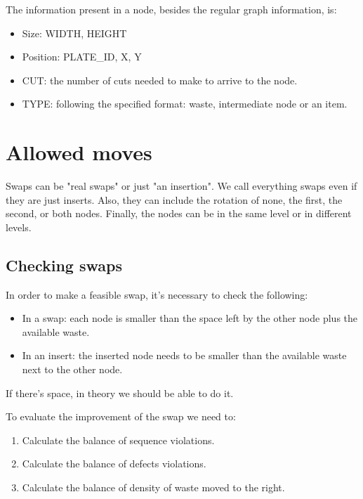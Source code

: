 \documentclass{roadef}
\begin{document}
        The information present in a node, besides the regular graph information, is:

        \begin{itemize}

            \item Size: WIDTH, HEIGHT
            \item Position: PLATE\_ID, X, Y
            \item CUT: the number of cuts needed to make to arrive to the node.
            \item TYPE: following the specified format: waste, intermediate node or an item.

        \end{itemize}

\section{Allowed moves}

    Swaps can be "real swaps" or just "an insertion". We call everything swaps even if they are just inserts.
    Also, they can include the rotation of none, the first, the second, or both nodes.
    Finally, the nodes can be in the same level or in different levels.

    \subsection{Checking swaps}

        In order to make a feasible swap, it's necessary to check the following:

        \begin{itemize}

            \item In a swap: each node is smaller than the space left by the other node plus the available waste.
            \item In an insert: the inserted node needs to be smaller than the available waste next to the other node.

        \end{itemize}

        If there's space, in theory we should be able to do it.

        To evaluate the improvement of the swap we need to:

        \begin{enumerate}

            \item Calculate the balance of sequence violations.
            \item Calculate the balance of defects violations.
            \item Calculate the balance of density of waste moved to the right.

        \end{enumerate}
\end{document}
